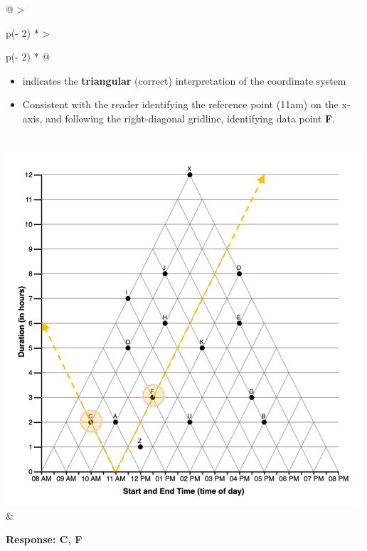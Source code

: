 \documentclass[
  letterpaper,
  DIV=11,
  numbers=noendperiod]{scrreprt}
\begin{document}
\begin{longtable}[]{@{}
  >{\raggedright\arraybackslash}p{(\columnwidth - 2\tabcolsep) * }
  >{\raggedright\arraybackslash}p{(\columnwidth - 2\tabcolsep) * }@{}}
\begin{minipage}[t]{\linewidth}
\begin{itemize}
\item
  indicates the \textbf{triangular} (correct) interpretation of the
  coordinate system
\item
  Consistent with the reader identifying the reference point (11am) on
  the x-axis, and following the right-diagonal gridline, identifying
  data point \textbf{F}.
\end{itemize}
\end{minipage} \\
\includegraphics[width=5.20833in,height=\textheight]{analysis/SGC3A/static/interpretations/Q1_111_CF.png}
& \begin{minipage}[t]{\linewidth}\raggedright
\textbf{Response: C, F}


\end{minipage}
\end{longtable}
\end{document}
